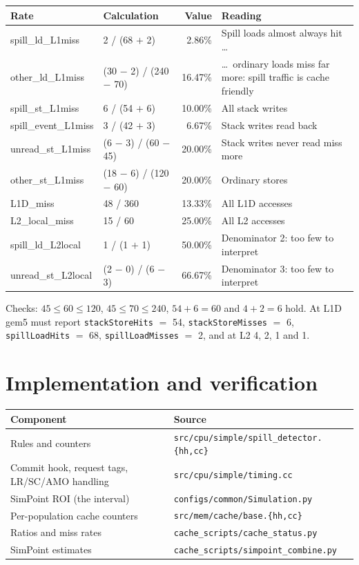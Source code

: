 \documentclass[10pt,a4paper]{article}
\newcommand{\ct}[1]{\texttt{#1}}
\begin{document}
{\small
\begin{tabularx}{\textwidth}{@{}>{\ttfamily}l l r X@{}}
\toprule
\normalfont\textbf{Rate} & \textbf{Calculation} & \textbf{Value}
  & \textbf{Reading} \\
\midrule
spill\_ld\_L1miss & 2 / (68 $+$ 2) & 2.86\% & Spill loads almost always hit
  \ldots \\
other\_ld\_L1miss & (30 $-$ 2) / (240 $-$ 70) & 16.47\% & \ldots\ ordinary
  loads miss far more: spill traffic is cache friendly \\
spill\_st\_L1miss & 6 / (54 $+$ 6) & 10.00\% & All stack writes \\
spill\_event\_L1miss & 3 / (42 $+$ 3) & 6.67\% & Stack writes read back \\
unread\_st\_L1miss & (6 $-$ 3) / (60 $-$ 45) & 20.00\% & Stack writes never
  read miss more \\
other\_st\_L1miss & (18 $-$ 6) / (120 $-$ 60) & 20.00\% & Ordinary stores \\
L1D\_miss & 48 / 360 & 13.33\% & All L1D accesses \\
L2\_local\_miss & 15 / 60 & 25.00\% & All L2 accesses \\
spill\_ld\_L2local & 1 / (1 $+$ 1) & 50.00\% & Denominator 2: too few to
  interpret \\
unread\_st\_L2local & (2 $-$ 0) / (6 $-$ 3) & 66.67\% & Denominator 3: too
  few to interpret \\
\bottomrule
\end{tabularx}
}

{\raggedright Checks: $45 \le 60 \le 120$, $45 \le 70 \le 240$, $54 + 6 = 60$ and
$4 + 2 = 6$ hold. At L1D gem5 must report \ct{stackStoreHits} $=$ 54,
\ct{stackStoreMisses} $=$ 6, \ct{spillLoadHits} $=$ 68,
\ct{spillLoadMisses} $=$ 2, and at L2 4, 2, 1 and 1.\par}

\section{Implementation and verification}

\begin{tabularx}{\textwidth}{@{}X l@{}}
\toprule
\textbf{Component} & \textbf{Source} \\
\midrule
Rules and counters
  & \texttt{src/cpu/simple/spill\_detector.\{hh,cc\}} \\
Commit hook, request tags, LR/SC/AMO handling
  & \texttt{src/cpu/simple/timing.cc} \\
SimPoint ROI (the interval)
  & \texttt{configs/common/Simulation.py} \\
Per-population cache counters
  & \texttt{src/mem/cache/base.\{hh,cc\}} \\
Ratios and miss rates
  & \texttt{cache\_scripts/cache\_status.py} \\
SimPoint estimates
  & \texttt{cache\_scripts/simpoint\_combine.py} \\
\bottomrule
\end{tabularx}
\end{document}

